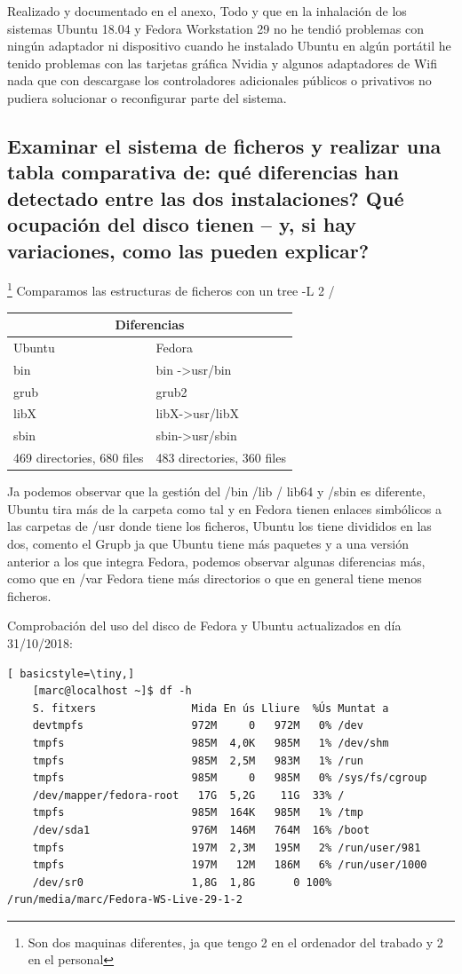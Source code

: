 \documentclass[preprint,11pt]{elsarticle}
\begin{document}
Realizado y documentado en el anexo, Todo y que en la inhalación de los sistemas Ubuntu 18.04 y Fedora Workstation 29 no he tendió problemas con ningún adaptador ni dispositivo cuando he instalado Ubuntu en algún portátil he tenido problemas con las tarjetas gráfica Nvidia y algunos adaptadores de Wifi nada que con descargase los controladores adicionales públicos o privativos no pudiera solucionar o reconfigurar parte del sistema.

\subsection{Examinar el sistema de ficheros y realizar una tabla comparativa de: qué diferencias han detectado entre las dos instalaciones? Qué ocupación del disco tienen – y, si hay variaciones, como las pueden explicar?} 
\footnote{Son dos maquinas diferentes, ja que tengo 2 en el ordenador del trabado y 2 en el personal} Comparamos las estructuras de ficheros con un tree -L 2 / 

\begin{tabular}{ |p{7cm}||p{7cm}| }
    \hline
    \multicolumn{2}{|c|}{Diferencias} \\
    \hline
    Ubuntu& Fedora\\
    \hline
   	bin   & bin -\textgreater  usr/bin   \\
    grub &   grub2 \\
    libX & libX-\textgreater usr/libX\\
    sbin & sbin-\textgreater usr/sbin\\
    469 directories, 680 files & 	483 directories, 360 files \\
    \hline
\end{tabular}

Ja podemos observar que la gestión del /bin /lib / lib64 y /sbin es diferente, Ubuntu tira más de la carpeta como tal y en Fedora tienen enlaces simbólicos a las carpetas de /usr donde tiene los ficheros, Ubuntu los tiene divididos en las dos, comento el Grupb ja que Ubuntu tiene más paquetes y a una versión anterior a los que integra Fedora, podemos observar algunas diferencias más, como que en /var Fedora tiene más directorios o que en general tiene menos ficheros. \bigskip

Comprobación del uso del disco de Fedora y Ubuntu actualizados en día 31/10/2018:
\begin{lstlisting}[ basicstyle=\tiny,]
    [marc@localhost ~]$ df -h
    S. fitxers               Mida En ús Lliure  %Ús Muntat a
    devtmpfs                 972M     0   972M   0% /dev
    tmpfs                    985M  4,0K   985M   1% /dev/shm
    tmpfs                    985M  2,5M   983M   1% /run
    tmpfs                    985M     0   985M   0% /sys/fs/cgroup
    /dev/mapper/fedora-root   17G  5,2G    11G  33% /
    tmpfs                    985M  164K   985M   1% /tmp
    /dev/sda1                976M  146M   764M  16% /boot
    tmpfs                    197M  2,3M   195M   2% /run/user/981
    tmpfs                    197M   12M   186M   6% /run/user/1000
    /dev/sr0                 1,8G  1,8G      0 100% /run/media/marc/Fedora-WS-Live-29-1-2

\end{lstlisting}
\end{document}

